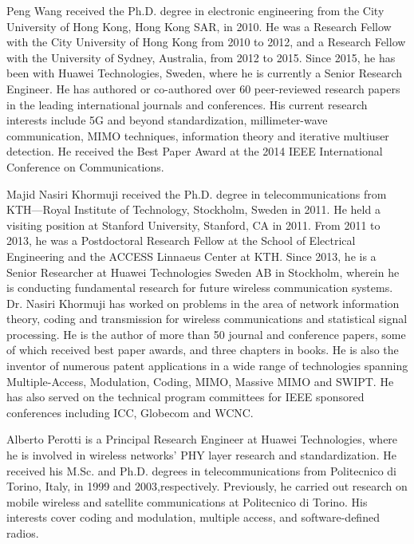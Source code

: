 \documentclass[journal]{IEEEtran}
\begin{document}
\begin{IEEEbiography}
{Peng Wang} received the Ph.D. degree in electronic engineering from the City University of Hong Kong, Hong Kong SAR, in 2010. He was a Research Fellow with the City University of Hong Kong from 2010 to 2012, and a Research Fellow with the University of Sydney, Australia, from 2012 to 2015. Since 2015, he has been with Huawei Technologies, Sweden, where he is currently a Senior Research Engineer. He has authored or co-authored over 60 peer-reviewed research papers in the leading international journals and conferences. His current research interests include 5G and beyond standardization, millimeter-wave communication, MIMO techniques, information theory and iterative multiuser detection. He received the Best Paper Award at the 2014 IEEE International Conference on Communications. 
\end{IEEEbiography}


\begin{IEEEbiography}{Majid Nasiri Khormuji}  received the Ph.D. degree in telecommunications from KTH—Royal Institute of Technology, Stockholm, Sweden in 2011. He held a visiting position at Stanford University, Stanford, CA in 2011. From 2011 to 2013, he was a Postdoctoral Research Fellow at the School of Electrical Engineering and the ACCESS Linnaeus Center at KTH. Since 2013, he is a Senior Researcher at Huawei Technologies Sweden AB in Stockholm, wherein he is conducting fundamental research for future wireless communication systems. Dr. Nasiri Khormuji has worked on problems in the area of network information theory, coding and transmission for wireless communications and statistical signal processing. He is the author of more than 50 journal and conference papers, some of which received best paper awards, and three chapters in books. He is also the inventor of numerous patent applications in a wide range of technologies spanning Multiple-Access, Modulation, Coding, MIMO, Massive MIMO and SWIPT. He has also served on the technical program committees for IEEE sponsored conferences including ICC, Globecom and WCNC.
\end{IEEEbiography}

\begin{IEEEbiography} {Alberto Perotti} is a Principal Research Engineer at Huawei Technologies, where he is involved in wireless networks’ PHY layer research and standardization.
He received his M.Sc. and Ph.D. degrees in telecommunications from Politecnico di Torino, Italy, in 1999 and 2003,respectively.
Previously, he carried out research on mobile wireless and satellite communications at Politecnico di Torino.
His interests cover coding and modulation, multiple access, and software-defined radios.
\end{IEEEbiography}
\end{document}
